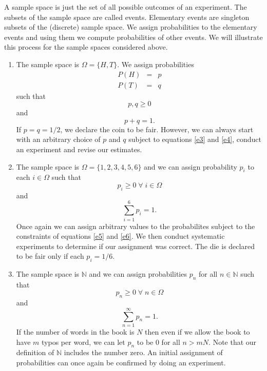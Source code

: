 \documentclass{article}
\begin{document}
A sample space is just the set of all possible outcomes of an experiment.
The subsets of the sample space are called events. Elementary events are
singleton subsets of the (discrete) sample space. We assign probabilities
to the elementary events and using them we compute probabilities of other
events. We will illustrate this process for the sample spaces considered
above.
\begin{enumerate}
\item The sample space is $\Omega = \{H, T\}$. We assign probabilities
\begin{eqnarray}
P(H) &=& p \label{e1} \\
P(T) &=& q \label{e2}
\end{eqnarray}
such that 
\begin{equation}\label{e3}
p, q \ge 0
\end{equation}
and 
\begin{equation}\label{e4}
p + q = 1.
\end{equation}
If $p = q = 1/2$, we declare the coin to be fair. However, we can always 
start with an arbitrary choice of $p$ and $q$ subject to equations 
\eqref{e3} and \eqref{e4}, conduct an experiment and revise our estimates.

\item The sample space is $\Omega = \{1, 2, 3, 4, 5, 6\}$ and we can 
assign probability $p_i$ to each $i \in \Omega$ such that
\begin{equation}\label{e5}
p_i \ge 0 \;\forall\; i \in \Omega
\end{equation}
and
\begin{equation}\label{e6}
\sum_{i=1}^6 p_i = 1.
\end{equation}
Once again we can assign arbitrary values to the probabilites subject to
the constraints of equations \eqref{e5} and \eqref{e6}. We then conduct
systematic experiments to determine if our assignment was correct. The
die is declared to be fair only if each $p_i = 1/6$.

\item The sample space is $\mathbb{N}$ and we can assign probabilities
$p_n$ for all $n \in \mathbb{N}$ such that 
\begin{equation}\label{e7}
p_n \ge 0 \;\forall\; n \in \Omega
\end{equation}
and
\begin{equation}\label{e8}
\sum_{n=1}^\infty p_n = 1.
\end{equation}
If the number of words in the book is $N$ then even if we allow the book
to have $m$ typos per word, we can let $p_n$ to be $0$ for all $n > mN$.
Note that our definition of $\mathbb{N}$ includes the number zero. An
initial assignment of probabilities can once again be confirmed by doing
an experiment.


\end{enumerate}
\end{document}
